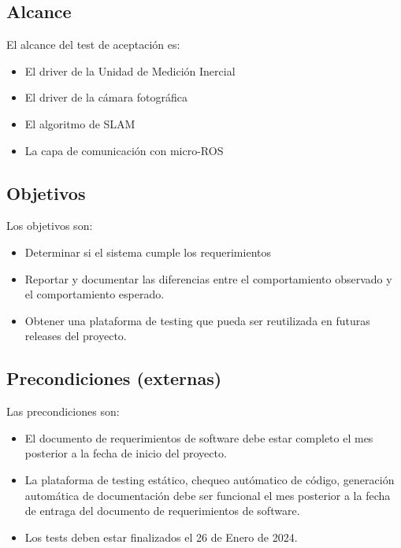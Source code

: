 \documentclass[
11pt, %
codirector, %
]{simple_charter}
\begin{document}
\subsection{Alcance}
\label{ssec:alcance}

El alcance del test de aceptación es:

\begin{itemize}
	\item El driver de la Unidad de Medición Inercial
	\item El driver de la cámara fotográfica
	\item El algoritmo de SLAM
	\item La capa de comunicación con micro-ROS
\end{itemize}

\subsection{Objetivos}
\label{ssec:objetivos}

Los objetivos son:

\begin{itemize}
	\item Determinar si el sistema cumple los requerimientos
	\item Reportar y documentar las diferencias entre el comportamiento observado y el
	comportamiento esperado.
	\item Obtener una plataforma de testing que pueda ser reutilizada en futuras releases del
	proyecto.
\end{itemize}

\subsection{Precondiciones (externas)}
\label{ssec:precondiciones-externas}

Las precondiciones son:

\begin{itemize}
	\item El documento de requerimientos de software debe estar completo el mes posterior a la fecha
	de inicio del proyecto.
	\item La plataforma de testing estático, chequeo autómatico de código, generación automática de
	documentación debe ser funcional el mes posterior a la fecha de entraga del documento de
	requerimientos de software.
	\item Los tests deben estar finalizados el 26 de Enero de 2024.
\end{itemize}
\end{document}
